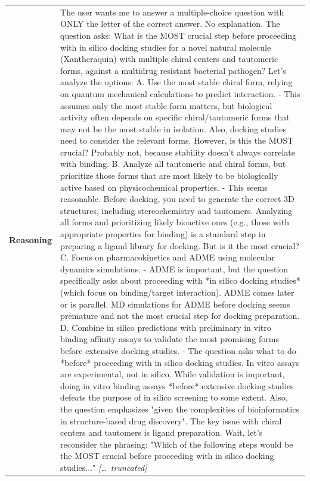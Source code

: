 \begin{longtable}{@{}l p{13cm}@{}}
  \textbf{Reasoning} & The user wants me to answer a multiple-choice question with ONLY the letter of the correct answer. No explanation. \newline The question asks: What is the MOST crucial step before proceeding with in silico docking studies for a novel natural molecule (Xantheraquin) with multiple chiral centers and tautomeric forms, against a multidrug resistant bacterial pathogen? \newline Let's analyze the options: \newline A. Use the most stable chiral form, relying on quantum mechanical calculations to predict interaction. \newline - This assumes only the most stable form matters, but biological activity often depends on specific chiral/tautomeric forms that may not be the most stable in isolation. Also, docking studies need to consider the relevant forms. However, is this the MOST crucial? Probably not, because stability doesn't always correlate with binding. \newline B. Analyze all tautomeric and chiral forms, but prioritize those forms that are most likely to be biologically active based on physicochemical properties. \newline - This seems reasonable. Before docking, you need to generate the correct 3D structures, including stereochemistry and tautomers. Analyzing all forms and prioritizing likely bioactive ones (e.g., those with appropriate properties for binding) is a standard step in preparing a ligand library for docking. But is it the most crucial? \newline C. Focus on pharmacokinetics and ADME using molecular dynamics simulations. \newline - ADME is important, but the question specifically asks about proceeding with *in silico docking studies* (which focus on binding/target interaction). ADME comes later or is parallel. MD simulations for ADME before docking seems premature and not the most crucial step for docking preparation. \newline D. Combine in silico predictions with preliminary in vitro binding affinity assays to validate the most promising forms before extensive docking studies. \newline - The question asks what to do *before* proceeding with in silico docking studies. In vitro assays are experimental, not in silico. While validation is important, doing in vitro binding assays *before* extensive docking studies defeats the purpose of in silico screening to some extent. Also, the question emphasizes "given the complexities of bioinformatics in structure-based drug discovery". The key issue with chiral centers and tautomers is ligand preparation. \newline Wait, let's reconsider the phrasing: "Which of the following steps would be the MOST crucial before proceeding with in silico docking studies..." \newline \textit{[\ldots\ truncated]}  \\

\end{longtable}
